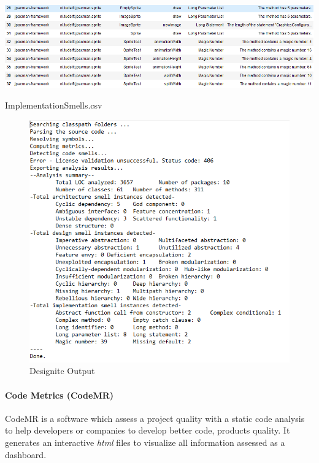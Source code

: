 \documentclass{article}
\begin{document}
\begin{table}[h]
    \includegraphics[scale=0.5]{imgs/badSmellsSample.PNG}
    \caption{ImplementationSmells.csv}
    \label{tab:BadSmells}
\end{table}

\begin{figure}
    \centering
    \includegraphics[scale=0.6]{imgs/DesigniteOutput.PNG}
    \caption{Designite Output}
    \label{fig:DesigniteOutput}
\end{figure}

\paragraph{Code Metrics (CodeMR)}

CodeMR is a software which assess a project quality with a static code analysis to help developers or companies to develop better code, products quality. It generates an interactive \textit{html} files to visualize all information assessed as a dashboard.\\
\end{document}
